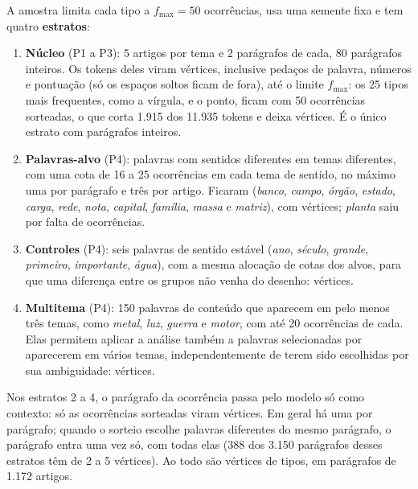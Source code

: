A amostra limita cada tipo a $f_{\max}=50$ ocorrências, usa uma semente fixa e tem quatro
\textbf{estratos}:
\begin{enumerate}
    \item \textbf{Núcleo} (P1 a P3): 5 artigos por tema e 2 parágrafos de cada, 80 parágrafos
    inteiros. Os tokens deles viram vértices, inclusive pedaços de palavra, números e
    pontuação (só os espaços soltos ficam de fora), até o limite $f_{\max}$: os 25 tipos mais
    frequentes, como a vírgula,  e o ponto, ficam com 50 ocorrências sorteadas, o
    que corta 1.915 dos 11.935 tokens e deixa \nVerticesNucleo{} vértices. É o único estrato
    com parágrafos inteiros.
    \item \textbf{Palavras-alvo} (P4): palavras com sentidos diferentes em temas diferentes,
    com uma cota de 16 a 25 ocorrências em cada tema de sentido, no máximo uma por parágrafo e
    três por artigo. Ficaram \nAlvosMantidos{} (\emph{banco}, \emph{campo}, \emph{órgão},
    \emph{estado}, \emph{carga}, \emph{rede}, \emph{nota}, \emph{capital}, \emph{família},
    \emph{massa} e \emph{matriz}), com \nVerticesAlvo{} vértices; \emph{planta} saiu por falta
    de ocorrências.
    \item \textbf{Controles} (P4): seis palavras de sentido estável (\emph{ano},
    \emph{século}, \emph{grande}, \emph{primeiro}, \emph{importante}, \emph{água}), com a mesma
    alocação de cotas dos alvos, para que uma diferença entre os grupos não venha do desenho:
    \nVerticesControle{} vértices.
    \item \textbf{Multitema} (P4): 150 palavras de conteúdo que aparecem em pelo menos três
    temas, como \emph{metal}, \emph{luz}, \emph{guerra} e \emph{motor}, com até 20 ocorrências
    de cada. Elas permitem aplicar a análise também a palavras selecionadas por aparecerem em
    vários temas, independentemente de terem sido escolhidas por sua ambiguidade:
    \nVerticesMultitema{} vértices.
\end{enumerate}
Nos estratos 2 a 4, o parágrafo da ocorrência passa pelo modelo só como contexto: só as
ocorrências sorteadas viram vértices. Em geral há uma por parágrafo; quando o sorteio escolhe
palavras diferentes do mesmo parágrafo, o parágrafo entra uma vez só, com todas elas (388 dos 3.150
parágrafos desses estratos têm de 2 a 5 vértices). Ao todo são \nVertices{} vértices de \nTipos{} tipos, em
\nSequencias{} parágrafos de 1.172 artigos.


